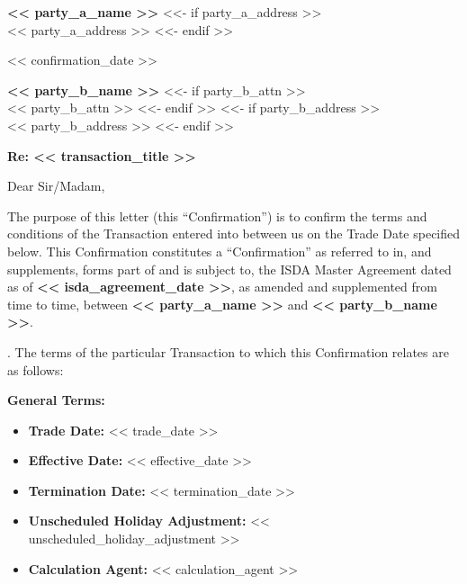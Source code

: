 \documentclass[11pt, a4paper]{article}
\newcommand{\templatetag}[1]{} %
\begin{document}

\begin{center}
    \textbf{<< party_a_name >>}
    <<- if party_a_address >>
    \\ << party_a_address >>
    <<- endif >>
\end{center}
\vspace{0.1cm}

\begin{flushright}
    << confirmation_date >>
\end{flushright}

\vspace{0.1cm}
\noindent \textbf{<< party_b_name >>}
<<- if party_b_attn >>
\\ << party_b_attn >>
<<- endif >>
<<- if party_b_address >>
\\ << party_b_address >>
<<- endif >>

\vspace{0.2cm}
\noindent \textbf{Re: << transaction_title >>}

\vspace{0.15cm}
\noindent Dear Sir/Madam,

\vspace{0.15cm}
\noindent The purpose of this letter (this ``Confirmation'') is to confirm the terms and conditions of the Transaction entered into between us on the Trade Date specified below. This Confirmation constitutes a ``Confirmation'' as referred to in, and supplements, forms part of and is subject to, the ISDA Master Agreement dated as of \textbf{<< isda_agreement_date >>}, as amended and supplemented from time to time, between \textbf{<< party_a_name >>} and \textbf{<< party_b_name >>}.

\vspace{0.2cm}
. The terms of the particular Transaction to which this Confirmation relates are as follows:

\vspace{0.2cm}
\noindent \textbf{General Terms:}
\begin{itemize}[leftmargin=2cm, label={}, itemsep=1pt]
    \item \textbf{Trade Date:} << trade_date >>
    \item \textbf{Effective Date:} << effective_date >>
    \item \textbf{Termination Date:} << termination_date >>
\templatetag{<<- if unscheduled_holiday_adjustment >>}
    \item \textbf{Unscheduled Holiday Adjustment:} << unscheduled_holiday_adjustment >>
\templatetag{<<- endif >>}
    \item \textbf{Calculation Agent:} << calculation_agent >>
\end{itemize}
\end{document}
